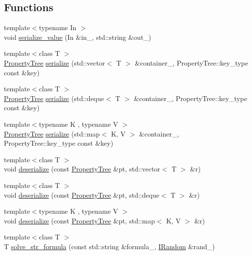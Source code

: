 \subsection*{Functions}
\begin{DoxyCompactItemize}
\item 
{\footnotesize template$<$typename In $>$ }\\void \hyperlink{namespaceserialize_afcd8d07d106f4bf71ce8813e6c2ccbd8}{serialize\+\_\+value} (In \&in\+\_\+, std\+::string \&out\+\_\+)
\item 
{\footnotesize template$<$class T $>$ }\\\hyperlink{namespacesolar__core_adeda2737d6938c190eb774a5b2495045}{Property\+Tree} \hyperlink{namespaceserialize_a48d3582d3d99189f6f067e77d962574f}{serialize} (std\+::vector$<$ T $>$ \&container\+\_\+, Property\+Tree\+::key\+\_\+type const \&key)
\item 
{\footnotesize template$<$class T $>$ }\\\hyperlink{namespacesolar__core_adeda2737d6938c190eb774a5b2495045}{Property\+Tree} \hyperlink{namespaceserialize_aa60e366236e42c68f437ea409aa0e056}{serialize} (std\+::deque$<$ T $>$ \&container\+\_\+, Property\+Tree\+::key\+\_\+type const \&key)
\item 
{\footnotesize template$<$typename K , typename V $>$ }\\\hyperlink{namespacesolar__core_adeda2737d6938c190eb774a5b2495045}{Property\+Tree} \hyperlink{namespaceserialize_a585cc862a49aec3bc1deca353af0b53c}{serialize} (std\+::map$<$ K, V $>$ \&container\+\_\+, Property\+Tree\+::key\+\_\+type const \&key)
\item 
{\footnotesize template$<$class T $>$ }\\void \hyperlink{namespaceserialize_a4c500beb6e6b8eb1c9e62376d3f5ce83}{deserialize} (const \hyperlink{namespacesolar__core_adeda2737d6938c190eb774a5b2495045}{Property\+Tree} \&pt, std\+::vector$<$ T $>$ \&r)
\item 
{\footnotesize template$<$class T $>$ }\\void \hyperlink{namespaceserialize_a067bdd480e2966e4a61457e64dfbca9e}{deserialize} (const \hyperlink{namespacesolar__core_adeda2737d6938c190eb774a5b2495045}{Property\+Tree} \&pt, std\+::deque$<$ T $>$ \&r)
\item 
{\footnotesize template$<$typename K , typename V $>$ }\\void \hyperlink{namespaceserialize_af7e18cf15b955d078b7fc036042cb083}{deserialize} (const \hyperlink{namespacesolar__core_adeda2737d6938c190eb774a5b2495045}{Property\+Tree} \&pt, std\+::map$<$ K, V $>$ \&r)
\item 
{\footnotesize template$<$class T $>$ }\\T \hyperlink{namespaceserialize_aa5ee0bad0c960a3f06430066217d8c12}{solve\+\_\+str\+\_\+formula} (const std\+::string \&formula\+\_\+, \hyperlink{classsolar__core_1_1_i_random}{I\+Random} \&rand\+\_\+)
\end{DoxyCompactItemize}
